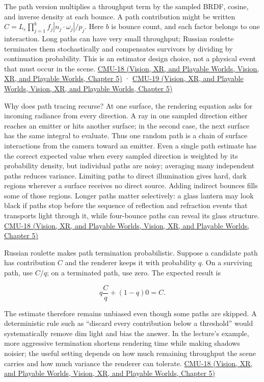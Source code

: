 The path version multiplies a throughput term by the sampled BRDF, cosine, and inverse density at each bounce. A path contribution might be written \(C= L_e\prod_{j=1}^b f_j|n_j\cdot\omega_j|/p_j\). Here \(b\) is bounce count, and each factor belongs to one interaction. Long paths can have very small throughput; Russian roulette terminates them stochastically and compensates survivors by dividing by continuation probability. This is an estimator design choice, not a physical event that must occur in the scene. \href{../07-Vision-XR-and-Playable-Worlds/main.pdf\#nameddest=04-visual-computing-ii-ch036-cmu-18---monte-carlo-rendering}{CMU-18 (Vision, XR, and Playable Worlds, Vision, XR, and Playable Worlds, Chapter 5)} · \href{../07-Vision-XR-and-Playable-Worlds/main.pdf\#nameddest=04-visual-computing-ii-ch036-cmu-19---variance-reduction}{CMU-19 (Vision, XR, and Playable Worlds, Vision, XR, and Playable Worlds, Chapter 5)}

Why does path tracing recurse? At one surface, the rendering equation asks for incoming radiance from every direction. A ray in one sampled direction either reaches an emitter or hits another surface; in the second case, the next surface has the same integral to evaluate. Thus one random path is a chain of surface interactions from the camera toward an emitter. Even a single path estimate has the correct expected value when every sampled direction is weighted by its probability density, but individual paths are noisy; averaging many independent paths reduces variance. Limiting paths to direct illumination gives hard, dark regions wherever a surface receives no direct source. Adding indirect bounces fills some of those regions. Longer paths matter selectively: a glass lantern may look black if paths stop before the sequence of reflection and refraction events that transports light through it, while four-bounce paths can reveal its glass structure. \href{../07-Vision-XR-and-Playable-Worlds/main.pdf\#nameddest=04-visual-computing-ii-ch036-cmu-18---monte-carlo-rendering}{CMU-18 (Vision, XR, and Playable Worlds, Vision, XR, and Playable Worlds, Chapter 5)}

Russian roulette makes path termination probabilistic. Suppose a candidate path has contribution \(C\) and the renderer keeps it with probability \(q\). On a surviving path, use \(C/q\); on a terminated path, use zero. The expected result is

\[
q\frac{C}{q}+(1-q)0=C.
\]

The estimate therefore remains unbiased even though some paths are skipped. A deterministic rule such as ``discard every contribution below a threshold'' would systematically remove dim light and bias the answer. In the lecture's example, more aggressive termination shortens rendering time while making shadows noisier; the useful setting depends on how much remaining throughput the scene carries and how much variance the renderer can tolerate. \href{../07-Vision-XR-and-Playable-Worlds/main.pdf\#nameddest=04-visual-computing-ii-ch036-cmu-18---monte-carlo-rendering}{CMU-18 (Vision, XR, and Playable Worlds, Vision, XR, and Playable Worlds, Chapter 5)}

